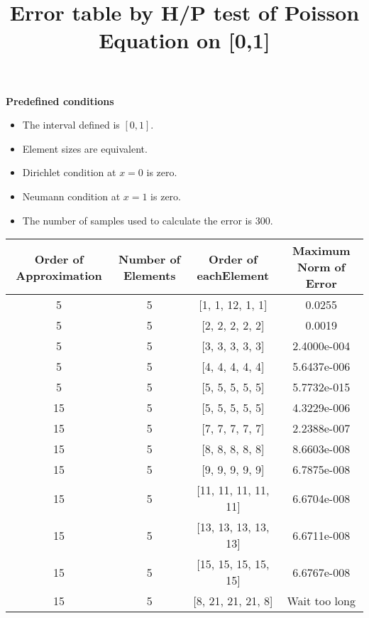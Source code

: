 \documentclass[11pt,letterpaper,landscape]{article}
\begin{document}
\title{Error table by H/P test of Poisson Equation on [0,1]}
\maketitle

{\bfseries Predefined conditions }

\begin{itemize}
\item The interval defined is $[0,1]$. \item Element sizes are
equivalent. \item Dirichlet condition at $x=0$ is zero. \item
Neumann condition at $x=1$ is zero. \item The number of samples
used to calculate the error is 300.
\end{itemize}
\begin{tabular}{|c|c|c|c|} \hline
Order of Approximation& Number of Elements & Order of eachElement&
Maximum Norm of Error \\ \hline \hline


5&5&[1, 1, 12, 1, 1]&0.0255 \\\hline

5&5&[2, 2, 2, 2, 2]&0.0019 \\ \hline

5&5&[3, 3, 3, 3, 3]&2.4000e-004\\ \hline

5&5&[4, 4, 4, 4, 4] & 5.6437e-006\\ \hline

5&5&[5, 5, 5, 5, 5]&5.7732e-015\\ \hline

15&5&[5, 5, 5, 5, 5]&4.3229e-006\\ \hline

15&5&[7, 7, 7, 7, 7]&2.2388e-007\\ \hline

15&5&[8, 8, 8, 8, 8]&8.6603e-008\\ \hline

15&5&[9, 9, 9, 9, 9]&6.7875e-008\\ \hline

15&5&[11, 11, 11, 11, 11]&6.6704e-008\\ \hline

15&5&[13, 13, 13, 13, 13]&6.6711e-008\\ \hline

15&5&[15, 15, 15, 15, 15]&6.6767e-008\\ \hline

15&5&[8, 21, 21, 21, 8]&Wait too long\\ \hline

\end{tabular}
\end{document}
